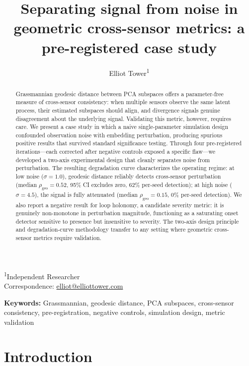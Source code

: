 \documentclass[11pt]{article}
\title{Separating signal from noise in geometric
  cross-sensor metrics: a pre-registered case study}
\author{Elliot Tower\textsuperscript{1}}
\date{}
\newcommand{\rhogeo}{\rho_\mathrm{geo}}
\begin{document}
\maketitle

\noindent\textsuperscript{1}Independent Researcher\\
\noindent Correspondence: \href{mailto:elliot@elliottower.com}{elliot@elliottower.com}

\bigskip

\begin{abstract}
Grassmannian geodesic distance between PCA subspaces offers a
parameter-free measure of cross-sensor consistency: when multiple
sensors observe the same latent process, their estimated subspaces
should align, and divergence signals genuine disagreement about the
underlying signal.  Validating this metric, however, requires care.
We present a case study in which a naive single-parameter simulation
design confounded observation noise with embedding perturbation,
producing spurious positive results that survived standard
significance testing.  Through four pre-registered iterations---each
corrected after negative controls exposed a specific flaw---we
developed a two-axis experimental design that cleanly separates
noise from perturbation.  The resulting degradation curve
characterizes the operating regime: at low noise
($\sigma = 1.0$), geodesic distance reliably detects cross-sensor
perturbation (median $\rhogeo = 0.52$, 95\% CI excludes zero,
62\% per-seed detection); at high noise ($\sigma = 4.5$), the
signal is fully attenuated (median $\rhogeo = 0.15$, 0\%
per-seed detection).  We also report a negative result for loop
holonomy, a candidate severity metric: it is genuinely
non-monotone in perturbation magnitude, functioning as a
saturating onset detector sensitive to presence but insensitive
to severity.  The
two-axis design principle and degradation-curve methodology
transfer to any setting where geometric cross-sensor metrics
require validation.
\end{abstract}

\noindent\textbf{Keywords:}
Grassmannian, geodesic distance, PCA subspaces, cross-sensor
consistency, pre-registration, negative controls, simulation design,
metric validation

\section{Introduction}
\label{sec:intro}
\end{document}
